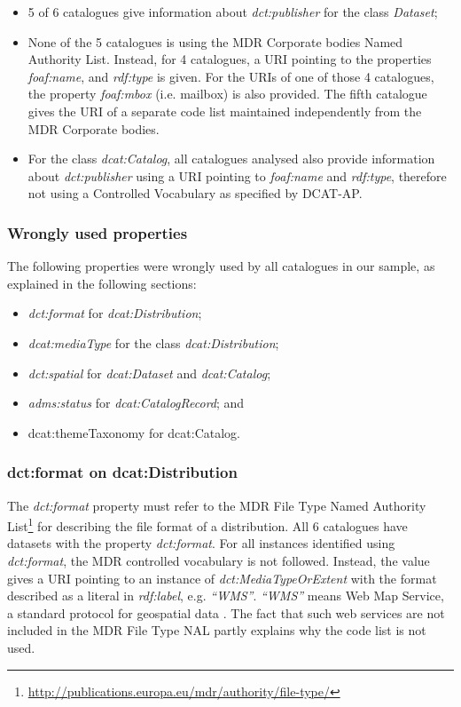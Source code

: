 \documentclass[<options>]{elsarticle}
\begin{document}
\begin{itemize}
\item 5 of 6 catalogues give information about \textit{dct:publisher} for the class \textit{Dataset};
\item None of the 5 catalogues is using the MDR Corporate bodies Named Authority List. Instead, for 4 catalogues, a URI pointing to the properties \textit{foaf:name}, and \textit{rdf:type} is given. For the URIs of one of those 4 catalogues, the property \textit{foaf:mbox} (i.e. mailbox) is also provided. The fifth catalogue gives the URI of a separate code list maintained independently from the MDR Corporate bodies.
\item For the class \textit{dcat:Catalog}, all catalogues analysed also provide information about \textit{dct:publisher} using a URI pointing to \textit{foaf:name} and \textit{rdf:type}, therefore not using a Controlled Vocabulary as specified by DCAT-AP.
\end{itemize}

\subsubsection{Wrongly used properties}
The following properties were wrongly used by all catalogues in our sample, as explained in the following sections: 
\begin{itemize}
\item \textit{dct:format} for \textit{dcat:Distribution};
\item \textit{dcat:mediaType} for the class \textit{dcat:Distribution}; 
\item \textit{dct:spatial} for \textit{dcat:Dataset} and \textit{dcat:Catalog}; 
\item \textit{adms:status} for \textit{dcat:CatalogRecord}; and 
\item dcat:themeTaxonomy for dcat:Catalog.
\end{itemize}

\subsubsection{dct:format on dcat:Distribution}
The \textit{dct:format} property must refer to the MDR File Type Named Authority List\footnote{\href{    http://publications.europa.eu/mdr/authority/file-type/}{http://publications.europa.eu/mdr/authority/file-type/}} for describing the file format of a distribution. All 6 catalogues have datasets with the property \textit{dct:format}. For all instances identified using \textit{dct:format}, the MDR controlled vocabulary is not followed. Instead, the value gives a URI pointing to an instance of \textit{dct:MediaTypeOrExtent} with the format described as a literal in \textit{rdf:label}, e.g. \textit{“WMS”}. \textit{“WMS”} means Web Map Service, a standard protocol for geospatial data . The fact that such web services are not included in the MDR File Type NAL partly explains why the code list is not used.
\end{document}
